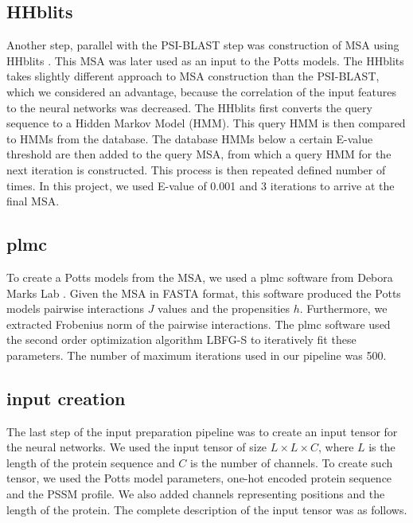 
\subsection{HHblits}
Another step, parallel with the PSI-BLAST step was construction of MSA using HHblits \cite{remmert2012hhblits}.
This MSA was later used as an input to the Potts models.
The HHblits takes slightly different approach to MSA construction than the PSI-BLAST, which we considered an advantage, because the correlation of the input features to the neural networks was decreased.
The HHblits first converts the query sequence to a Hidden Markov Model (HMM).
This query HMM is then compared to HMMs from the database.
The database HMMs below a certain E-value threshold are then added to the query MSA, from which a query HMM for the next iteration is constructed.
This process is then repeated defined number of times.
In this project, we used E-value of 0.001 and 3 iterations to arrive at the final MSA.

\subsection{plmc}
To create a Potts models from the MSA, we used a plmc software from Debora Marks Lab \cite{plmc}.
Given the MSA in FASTA format, this software produced the Potts models pairwise interactions $J$ values and the propensities $h$.
Furthermore, we extracted Frobenius norm of the pairwise interactions.
The plmc software used the second order optimization algorithm LBFG-S to iteratively fit these parameters.
The number of maximum iterations used in our pipeline was 500.

\subsection{input creation}
The last step of the input preparation pipeline was to create an input tensor for the neural networks.
We used the input tensor of size $L \times L \times C$, where $L$ is the length of the protein sequence and $C$ is the number of channels.
To create such tensor, we used the Potts model parameters, one-hot encoded protein sequence and the PSSM profile.
We also added channels representing positions and the length of the protein.
The complete description of the input tensor was as follows.

